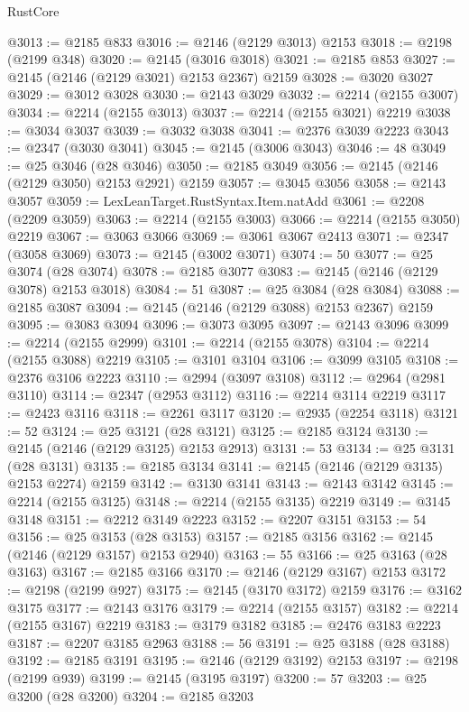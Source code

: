 \begin{lexlean}{RustCore}
\begin{coremodule}
@3013 := @2185 @833
@3016 := @2146 (@2129 @3013) @2153
@3018 := @2198 (@2199 @348)
@3020 := @2145 (@3016 @3018)
@3021 := @2185 @853
@3027 := @2145 (@2146 (@2129 @3021) @2153 @2367) @2159
@3028 := @3020 @3027
@3029 := @3012 @3028
@3030 := @2143 @3029
@3032 := @2214 (@2155 @3007)
@3034 := @2214 (@2155 @3013)
@3037 := @2214 (@2155 @3021) @2219
@3038 := @3034 @3037
@3039 := @3032 @3038
@3041 := @2376 @3039 @2223
@3043 := @2347 (@3030 @3041)
@3045 := @2145 (@3006 @3043)
@3046 := 48
@3049 := @25 @3046 (@28 @3046)
@3050 := @2185 @3049
@3056 := @2145 (@2146 (@2129 @3050) @2153 @2921) @2159
@3057 := @3045 @3056
@3058 := @2143 @3057
@3059 := LexLeanTarget.RustSyntax.Item.natAdd
@3061 := @2208 (@2209 @3059)
@3063 := @2214 (@2155 @3003)
@3066 := @2214 (@2155 @3050) @2219
@3067 := @3063 @3066
@3069 := @3061 @3067 @2413
@3071 := @2347 (@3058 @3069)
@3073 := @2145 (@3002 @3071)
@3074 := 50
@3077 := @25 @3074 (@28 @3074)
@3078 := @2185 @3077
@3083 := @2145 (@2146 (@2129 @3078) @2153 @3018)
@3084 := 51
@3087 := @25 @3084 (@28 @3084)
@3088 := @2185 @3087
@3094 := @2145 (@2146 (@2129 @3088) @2153 @2367) @2159
@3095 := @3083 @3094
@3096 := @3073 @3095
@3097 := @2143 @3096
@3099 := @2214 (@2155 @2999)
@3101 := @2214 (@2155 @3078)
@3104 := @2214 (@2155 @3088) @2219
@3105 := @3101 @3104
@3106 := @3099 @3105
@3108 := @2376 @3106 @2223
@3110 := @2994 (@3097 @3108)
@3112 := @2964 (@2981 @3110)
@3114 := @2347 (@2953 @3112)
@3116 := @2214 @3114 @2219
@3117 := @2423 @3116
@3118 := @2261 @3117
@3120 := @2935 (@2254 @3118)
@3121 := 52
@3124 := @25 @3121 (@28 @3121)
@3125 := @2185 @3124
@3130 := @2145 (@2146 (@2129 @3125) @2153 @2913)
@3131 := 53
@3134 := @25 @3131 (@28 @3131)
@3135 := @2185 @3134
@3141 := @2145 (@2146 (@2129 @3135) @2153 @2274) @2159
@3142 := @3130 @3141
@3143 := @2143 @3142
@3145 := @2214 (@2155 @3125)
@3148 := @2214 (@2155 @3135) @2219
@3149 := @3145 @3148
@3151 := @2212 @3149 @2223
@3152 := @2207 @3151
@3153 := 54
@3156 := @25 @3153 (@28 @3153)
@3157 := @2185 @3156
@3162 := @2145 (@2146 (@2129 @3157) @2153 @2940)
@3163 := 55
@3166 := @25 @3163 (@28 @3163)
@3167 := @2185 @3166
@3170 := @2146 (@2129 @3167) @2153
@3172 := @2198 (@2199 @927)
@3175 := @2145 (@3170 @3172) @2159
@3176 := @3162 @3175
@3177 := @2143 @3176
@3179 := @2214 (@2155 @3157)
@3182 := @2214 (@2155 @3167) @2219
@3183 := @3179 @3182
@3185 := @2476 @3183 @2223
@3187 := @2207 @3185 @2963
@3188 := 56
@3191 := @25 @3188 (@28 @3188)
@3192 := @2185 @3191
@3195 := @2146 (@2129 @3192) @2153
@3197 := @2198 (@2199 @939)
@3199 := @2145 (@3195 @3197)
@3200 := 57
@3203 := @25 @3200 (@28 @3200)
@3204 := @2185 @3203

\end{coremodule}
\end{lexlean}
